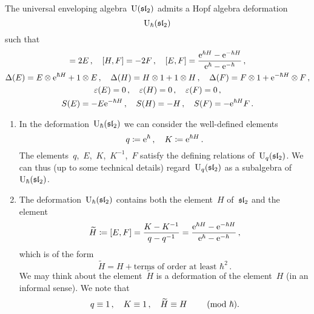 \documentclass[a4paper, 11pt, oneside]{scrartcl}
\begin{document}
\begin{theorem}
  The universal enveloping algebra~$\operatorname{U}(\mathfrak{sl}_2)$ admits a Hopf algebra deformation
  \[
    \operatorname{U}_{\hbar}(\mathfrak{sl}_2)
  \]
  such that
  \begin{gather*}
    [H, E] = 2E \,,
    \quad
    [H, F] = -2F \,,
    \quad
    [E, F]
    =
    \frac{ \e^{\hbar H} - \e^{-\hbar H} }{ \e^{\hbar} - \e^{-\hbar} } \,,
    \\
    \Delta(E) = E \tensor \e^{\hbar H} + 1 \tensor E \,,
    \quad
    \Delta(H) = H \tensor 1 + 1 \tensor H \,,
    \quad
    \Delta(F) = F \tensor 1 + \e^{-\hbar H} \tensor F \,,
    \\
    \varepsilon(E) = 0 \,,
    \quad
    \varepsilon(H) = 0 \,,
    \quad
    \varepsilon(F) = 0 \,,
    \\
    S(E) = -E \e^{-\hbar H} \,,
    \quad
    S(H) = -H \,,
    \quad
    S(F) = - \e^{\hbar H} F \,.
  \end{gather*}
\end{theorem}

\begin{remark}
  \leavevmode
  \begin{enumerate}
    \item
      In the deformation~$\operatorname{U}_{\hbar}(\mathfrak{sl}_2)$ we can consider the well-defined elements
      \[
        q \coloneqq \mathrm{e}^{\hbar} \,,
        \quad
        K \coloneqq \mathrm{e}^{\hbar H} \,.
      \]
      The elements~$q$,~$E$,~$K$,~$K^{-1}$,~$F$ satisfy the defining relations of~$\operatorname{U}_q(\mathfrak{sl}_2)$.
      We can thus (up to some technical details) regard~$\operatorname{U}_q(\mathfrak{sl}_2)$ as a subalgebra of~$\operatorname{U}_{\hbar}(\mathfrak{sl}_2)$.
    \item
      The deformation~$\operatorname{U}_{\hbar}(\mathfrak{sl}_2)$ contains both the element~$H$ of~$\mathfrak{sl}_2$ and the element
      \[
        \widetilde{H}
        \coloneqq
        [E,F]
        =
        \frac{K - K^{-1}}{q - q^{-1}}
        =
        \frac{\mathrm{e}^{\hbar H} - \mathrm{e}^{-\hbar H}}{\mathrm{e}^{\hbar} - \mathrm{e}^{-\hbar}} \,,
      \]
      which is of the form
      \[
        \widetilde{H}
        =
        H + \text{terms of order at least~$\hbar^2$} \,.
      \]
      We may think about the element~$\widetilde{H}$ is a deformation of the element~$H$ (in an informal sense).
      We note that
      \[
        q \equiv 1 \,,
        \quad
        K \equiv 1 \,,
        \quad
        \widetilde{H} \equiv H
        \qquad
        \ (\mathrm{mod}\ \hbar).
      \]
  \end{enumerate}
\end{remark}
\end{document}
